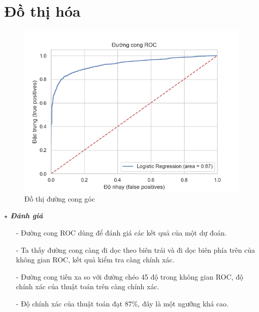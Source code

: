 \documentclass{report}
\newcommand\tab[1][1.25cm]{\hspace*{#1}}
\begin{document}
    \fontsize{16}{10}\selectfont
    \section{Đồ thị hóa}
        \begin{figure}[htp]
            \begin{center}
                \tab[1cm]\includegraphics[scale = 0.85]{image/roc.png}
                \caption{Đồ thị đường cong góc}
            \end{center}
        \end{figure}
    
        \fontsize{13}{10}\selectfont \textbf{$\star$\textit{ Đánh giá}}
            \begin{enumerate}
                \item [- ] Đường cong ROC dùng để đánh giá các kết quả của một dự đoán.
                \item [- ] Ta thấy đường cong càng đi dọc theo biên trái và đi dọc biên phía trên của không gian ROC, kết quả kiểm tra càng chính xác.
                \item [- ] Đường cong tiến xa so với đường chéo 45 độ trong không gian ROC, độ chính xác của thuật toán trên càng chính xác.
                \item [- ] Độ chính xác của thuật toán đạt 87\%, đây là một ngưỡng khá cao.
            \end{enumerate}
            
\fontsize{18}{10}\selectfont
\end{document}
